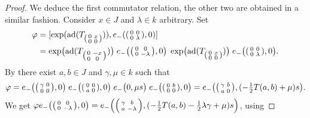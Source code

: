 \documentclass[oneside,a4paper]{amsart} %
\theoremstyle{definition}
\DeclareMathOperator{\ad}{ad}
\numberwithin{equation}{section}
\begin{document}
\begin{proof}
	We deduce the first commutator relation, the other two are obtained in a similar fashion.
	Consider $x\in J$ and $\lambda\in k$ arbitrary.
	Set 
	\begin{align*} 
		\varphi &=[\exp(\ad(T_{\begin{psmallmatrix} 0&x\\0&0 \end{psmallmatrix}})),e_-(\begin{psmallmatrix} 0&0\\0&\lambda \end{psmallmatrix},0)]\\
			&=\exp \bigl( \ad(T_{\begin{psmallmatrix} 0&-x\\0&0 \end{psmallmatrix}}) \bigr) \; e_- \bigl( \begin{psmallmatrix} 0&0\\0&-\lambda \end{psmallmatrix},0 \bigr) \; \exp \bigl( \ad(T_{\begin{psmallmatrix} 0&x\\0&0 \end{psmallmatrix}}) \bigr) \; e_- \bigl( \begin{psmallmatrix} 0&0\\0&\lambda \end{psmallmatrix},0 \bigr) .
	\end{align*}
	By \cite[Proposition 5.5]{Tits2002} there exist $a,b\in J$ and $\gamma, \mu\in k$ such that 
	\[ \varphi = e_- \bigl( \begin{psmallmatrix} \gamma &0\\0&0 \end{psmallmatrix},0 \bigr) \; e_- \bigl( \begin{psmallmatrix} 0&0\\a&0 \end{psmallmatrix},0 \bigr) \; e_- \bigl( 0,\mu s \bigr) \; e_- \bigl( \begin{psmallmatrix} 0 &b\\0&0 \end{psmallmatrix},0 \bigr)
	   = e_- \bigl( \begin{psmallmatrix} \gamma &b\\a&0 \end{psmallmatrix},(-\tfrac{1}{2} T(a,b)+\mu) s \bigr) . \]
	We get $\varphi e_- \bigl( \begin{psmallmatrix} 0 &0\\0&-\lambda \end{psmallmatrix},0 \bigr) = e_- \Bigl( \begin{psmallmatrix} \gamma &b\\a&-\lambda \end{psmallmatrix},(-\frac{1}{2}T(a,b)-\frac{1}{2}\lambda\gamma+\mu)s \Bigr)$, using 

\end{proof}
\end{document}
